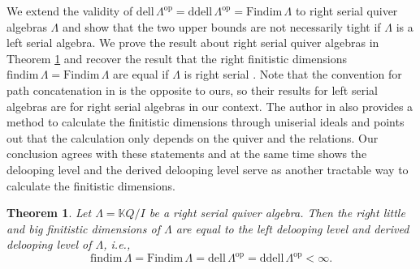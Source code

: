 \documentclass{conm-p-l}
\newcommand{\findim}{\mathrm{findim}\,}
\newcommand{\Findim}{\mathrm{Findim}\,}
\newcommand{\dell}{\mathrm{dell}\,}
\renewcommand{\dell}{\mathrm{dell}\,}
\newcommand{\op}{\mathrm{op}}
\renewcommand{\k}{\mathbb{K}}
\newcommand{\ddell}{\mathrm{ddell}\,}
\newtheorem{theorem}{Theorem}[section]
\theoremstyle{definition}
\theoremstyle{remark}
\numberwithin{equation}{section}
\begin{document}
We extend the validity of $\dell\Lambda^{\op}=\ddell\Lambda^{\op}=\Findim\Lambda$ to right serial quiver algebras $\Lambda$ and show that the two upper bounds are not necessarily tight if $\Lambda$ is a left serial algebra. We prove the result about right serial quiver algebras in Theorem \ref{thm:right serial} and recover the result that the right finitistic dimensions $\findim\Lambda=\Findim\Lambda$ are equal if $\Lambda$ is right serial \cite{huisgen1992syzygies}. Note that the convention for path concatenation in \cite{huisgen1992syzygies} is the opposite to ours, so their results for left serial algebras are for right serial algebras in our context. The author in \cite{huisgen1992syzygies} also provides a method to calculate the finitistic dimensions through uniserial ideals and points out that the calculation only depends on the quiver and the relations. Our conclusion agrees with these statements and at the same time shows the delooping level and the derived delooping level serve as another tractable way to calculate the finitistic dimensions.

\begin{theorem}
\label{thm:right serial}
Let $\Lambda=\k Q/I$ be a right serial quiver algebra. Then the right little and big finitistic dimensions of $\Lambda$ are equal to the left delooping level and derived delooping level of $\Lambda$, \textit{i.e.},
\[
\findim\Lambda = \Findim\Lambda = \dell\Lambda^{\op} = \ddell\Lambda^{\op} < \infty.
\]
\end{theorem}
\end{document}
